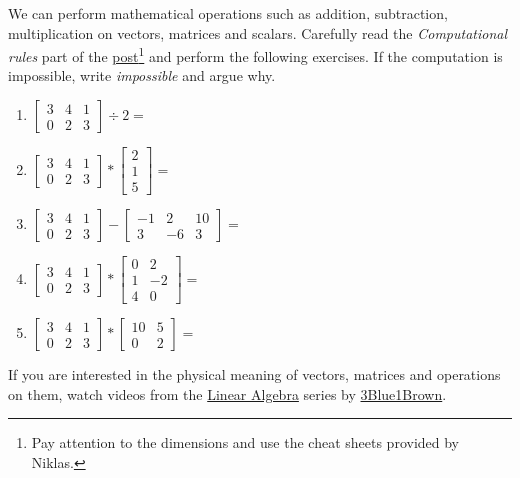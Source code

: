 \begin{exercise}

We can perform mathematical operations such as addition, subtraction, multiplication on vectors, matrices and scalars.
Carefully read the \textit{Computational rules} part of the \href{\post}{post\footnote{Pay attention to the dimensions and use the cheat sheets provided by Niklas.}} and perform the following exercises.
If the computation is impossible, write \textit{impossible} and argue why.

\begin{enumerate}
    \item $\begin{bmatrix} 3 & 4 & 1 \\ 0 & 2 & 3 \end{bmatrix} \div 2 = $
    \item $\begin{bmatrix} 3 & 4 & 1 \\ 0 & 2 & 3 \end{bmatrix} \ast \begin{bmatrix} 2 \\ 1 \\ 5  \end{bmatrix} = $
    \item $\begin{bmatrix} 3 & 4 & 1 \\ 0 & 2 & 3 \end{bmatrix} - \begin{bmatrix} -1 & 2 & 10 \\ 3 & -6 & 3 \end{bmatrix} = $
    \item $\begin{bmatrix} 3 & 4 & 1 \\ 0 & 2 & 3 \end{bmatrix} \ast \begin{bmatrix} 0 & 2 \\ 1 & -2 \\ 4 & 0 \end{bmatrix} = $
    \item $\begin{bmatrix} 3 & 4 & 1 \\ 0 & 2 & 3 \end{bmatrix} \ast \begin{bmatrix} 10 & 5 \\ 0 & 2 \end{bmatrix} = $
\end{enumerate}

If you are interested in the physical meaning of vectors, matrices and operations on them, watch videos from the \href{https://www.youtube.com/playlist?list=PLZHQObOWTQDPD3MizzM2xVFitgF8hE_ab}{Linear Algebra} series by \href{https://www.youtube.com/channel/UCYO_jab_esuFRV4b17AJtAw}{3Blue1Brown}.

\end{exercise}

